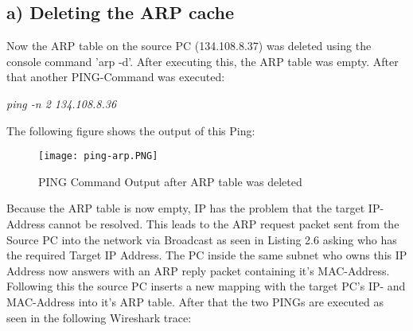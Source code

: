 \subsection{a) Deleting the ARP cache}
\label{arp1}
Now the ARP table on the source PC (134.108.8.37) was deleted using the console command 'arp -d'. After executing this, the ARP table was empty. After that another PING-Command was executed:
\begin{center}
	\textit{ping -n 2 134.108.8.36}
\end{center}
The following figure shows the output of this Ping:
\begin{figure}[H]
	\centering
	\texttt{[image: ping-arp.PNG]}
	\caption{PING Command Output after ARP table was deleted}
	\label{ping-arp}
\end{figure} 
Because the ARP table is now empty, IP has the problem that the target IP-Address cannot be resolved. This leads to the ARP request packet sent from the Source PC into the network via Broadcast as seen in Listing 2.6 asking who has the required Target IP Address. The PC inside the same subnet who owns this IP Address now answers with an ARP reply packet containing it's MAC-Address. Following this the source PC inserts a new mapping with the target PC's IP- and MAC-Address into it's ARP table. After that the two PINGs are executed as seen in the following Wireshark trace:\\

